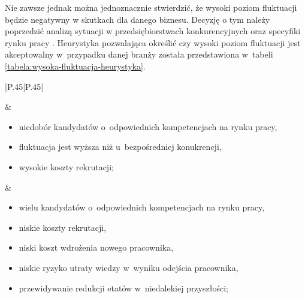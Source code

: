 Nie zawsze jednak można jednoznacznie stwierdzić, że wysoki poziom fluktuacji będzie negatywny w skutkach dla danego biznesu.
Decyzję o tym należy poprzedzić analizą sytuacji w przedsiębiorstwach konkurencyjnych oraz specyfiki rynku pracy \cite{taylor-2006}.
Heurystyka pozwalająca określić czy wysoki poziom fluktuacji jest akceptowalny w~przypadku danej branży została przedstawiona w~tabeli \ref{tabela:wysoka-fluktuacja-heurystyka}.

\noindent\begin{minipage}{\textwidth}
             \begin{table}[H]
                 \raggedright\caption{Heurystyka do oceny wysokiego poziomu fluktuacji\label{tabela:wysoka-fluktuacja-heurystyka}}
                 \begin{center}
                     \begin{tabular}{|P{.45\textwidth}|P{.45\textwidth}|}

                         \hline
                          &
                          \\
                         \hline

                         \begin{itemize}
                             \item niedobór kandydatów o~odpowiednich kompetencjach na rynku pracy,
                             \item fluktuacja jest wyższa niż u~bezpośredniej konukrencji,
                             \item wysokie koszty rekrutacji;
                         \end{itemize} &
                         \begin{itemize}
                             \item wielu kandydatów o~odpowiednich kompetencjach na rynku pracy,
                             \item niskie koszty rekrutacji,
                             \item niski koszt wdrożenia nowego pracownika,
                             \item niskie ryzyko utraty wiedzy w~wyniku odejścia pracownika,
                             \item przewidywanie redukcji etatów w~niedalekiej przyszłości;
                         \end{itemize} \\
                         \hline
                     \end{tabular}
                 \end{center}
                 \raggedright{}
                 \vspace{0.75cm}
             \end{table}
\end{minipage}

